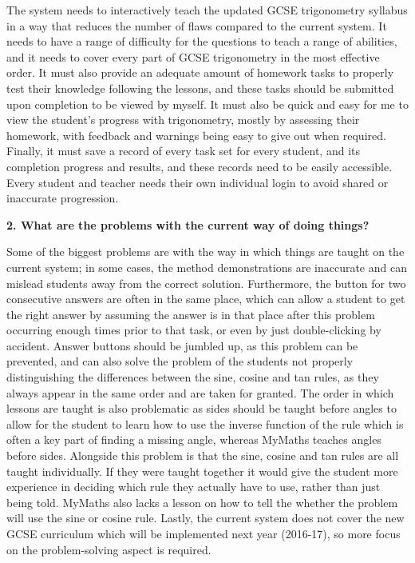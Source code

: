 The system needs to interactively teach the updated GCSE trigonometry syllabus in a way that reduces the number of flaws compared to the current system. It needs to have a range of difficulty for the questions to teach a range of abilities, and it needs to cover every part of GCSE trigonometry in the most effective order. It must also provide an adequate amount of homework tasks to properly test their knowledge following the lessons, and these tasks should be submitted upon completion to be viewed by myself. It must also be quick and easy for me to view the student's progress with trigonometry, mostly by assessing their homework, with feedback and warnings being easy to give out when required. Finally, it must save a record of every task set for every student, and its completion progress and results, and these records need to be easily accessible. Every student and teacher needs their own individual login to avoid shared or inaccurate progression.

\textbf{2. What are the problems with the current way of doing things?}

Some of the biggest problems are with the way in which things are taught on the current system; in some cases, the method demonstrations are inaccurate and can mislead students away from the correct solution. Furthermore, the button for two consecutive answers are often in the same place, which can allow a student to get the right answer by assuming the answer is in that place after this problem occurring enough times prior to that task, or even by just double-clicking by accident. Answer buttons should be jumbled up, as this problem can be prevented, and can also solve the problem of the students not properly distinguishing the differences between the sine, cosine and tan rules, as they always appear in the same order and are taken for granted. The order in which lessons are taught is also problematic as sides should be taught before angles to allow for the student to learn how to use the inverse function of the rule which is often a key part of finding a missing angle, whereas MyMaths teaches angles before sides. Alongside this problem is that the sine, cosine and tan rules are all taught individually. If they were taught together it would give the student more experience in deciding which rule they actually have to use, rather than just being told. MyMaths also lacks a lesson on how to tell the whether the problem will use the sine or cosine rule. Lastly, the current system does not cover the new GCSE curriculum which will be implemented next year (2016-17), so more focus on the problem-solving aspect is required.

